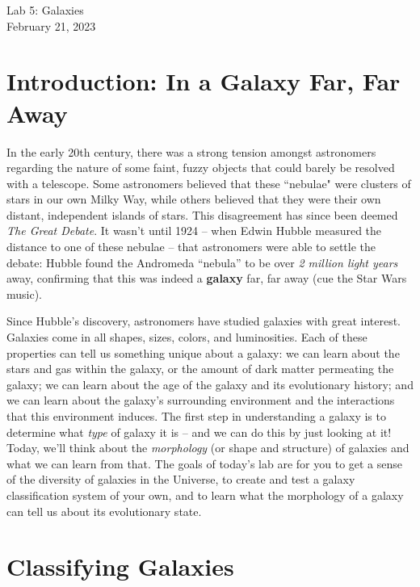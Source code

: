 \documentclass[11pt]{article}
\begin{document}
\begin{center}
\huge{Lab 5: Galaxies}\\ \medskip \Large{February 21, 2023}
\end{center}

\section{Introduction: In a Galaxy Far, Far Away}
In the early 20th century, there was a strong tension amongst astronomers regarding the nature of some faint, fuzzy objects that could barely be resolved with a telescope. Some astronomers believed that these ``nebulae" were clusters of stars in our own Milky Way, while others believed that they were their own distant, independent islands of stars. This disagreement has since been deemed \textit{The Great Debate}. It wasn't until 1924 -- when Edwin Hubble measured the distance to one of these nebulae -- that astronomers were able to settle the debate: Hubble found the Andromeda ``nebula'' to be over \emph{2 million light years} away, confirming that this was indeed a \textbf{galaxy} far, far away (cue the Star Wars music).


\medskip
Since Hubble's discovery, astronomers have studied galaxies with great interest. Galaxies come in all shapes, sizes, colors, and luminosities.  Each of these properties can tell us something unique about a galaxy: we can learn about the stars and gas within the galaxy, or the amount of dark matter permeating the galaxy; we can learn about the age of the galaxy and its evolutionary history; and we can learn about the galaxy's surrounding environment and the interactions that this environment induces. The first step in understanding a galaxy is to determine what \emph{type} of galaxy it is -- and we can do this by just looking at it!  Today, we'll think about the \textit{morphology} (or shape and structure) of galaxies and what we can learn from that. The goals of today's lab are for you to get a sense of the diversity of galaxies in the Universe, to create and test a galaxy classification system of your own, and to learn what the morphology of a galaxy can tell us about its evolutionary state.

\section{Classifying Galaxies}
\end{document}
